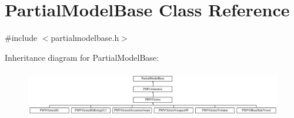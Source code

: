 \hypertarget{classPartialModelBase}{}\section{Partial\+Model\+Base Class Reference}
\label{classPartialModelBase}


{\ttfamily \#include $<$partialmodelbase.\+h$>$}

Inheritance diagram for Partial\+Model\+Base\+:\begin{figure}[H]
\begin{center}
\leavevmode
\includegraphics[height=2.097378cm]{classPartialModelBase}
\end{center}
\end{figure}
